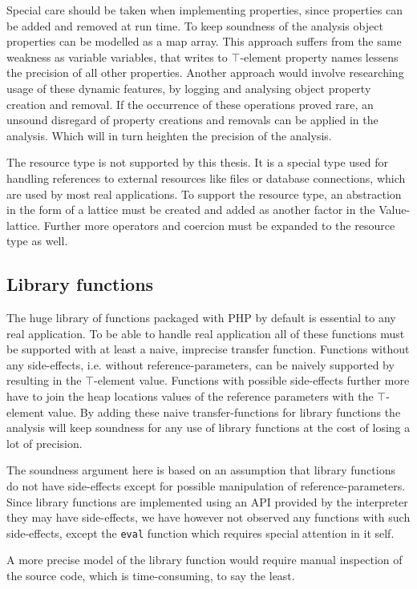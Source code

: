Special care should be taken when implementing properties, since properties can be added and removed at run time. To keep soundness of the analysis object properties can be modelled as a map array. This approach suffers from the same weakness as variable variables, that writes to $\top$-element property names lessens the precision of all other properties. Another approach would involve researching usage of these dynamic features, by  logging and analysing object property creation and removal. If the occurrence of these operations proved rare, an unsound disregard of property creations and removals can be applied in the analysis. Which will in turn heighten the precision of the analysis.

The resource type is not supported by this thesis. It is a special type used for handling references to external resources like files or database connections, which are used by most real applications. To support the resource type, an abstraction in the form of a lattice must be created and added as another factor in the Value-lattice. Further more operators and coercion must be expanded to the resource type as well.

\subsection{Library functions}
The huge library of functions packaged with PHP by default is essential to any real application. To be able to handle real application all of these functions must be supported with at least a naive, imprecise transfer function. Functions without any side-effects, i.e. without reference-parameters, can be naively supported by resulting in the $\top$-element value. Functions with possible side-effects further more have to join the heap locations values of the reference parameters with the $\top$-element value. By adding these naive transfer-functions for library functions the analysis will keep soundness for any use of library functions at the cost of losing a lot of precision. 

The soundness argument here is based on an assumption that library functions do not have side-effects except for possible manipulation of reference-parameters. Since library functions are implemented using an API provided by the interpreter they may have side-effects, we have however not observed any functions with such side-effects, except the \texttt{eval} function which requires special attention in it self. 

A more precise model of the library function would require manual inspection of the source code, which is  time-consuming, to say the least.


